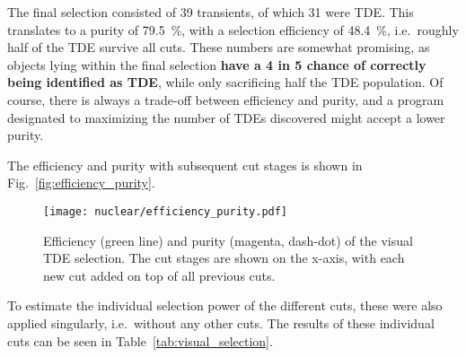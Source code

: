 The final selection consisted of 39 transients, of which 31 were TDE. This translates to a purity of \SI{79.5}{\percent}, with a selection efficiency of \SI{48.4}{\percent}, i.e.~roughly half of the TDE survive all cuts. These numbers are somewhat promising, as objects lying within the final selection \textbf{have a 4 in 5 chance of correctly being identified as TDE}, while only sacrificing half the TDE population. Of course, there is always a trade-off between efficiency and purity, and a program designated to maximizing the number of TDEs discovered might accept a lower purity.

The efficiency and purity with subsequent cut stages is shown in Fig.~\ref{fig:efficiency_purity}.

\begin{figure}[htpb]
    \texttt{[image: nuclear/efficiency\_purity.pdf]}
    \caption[Visual TDE selection]{Efficiency (green line) and purity (magenta, dash-dot) of the visual TDE selection. The cut stages are shown on the x-axis, with each new cut added on top of all previous cuts.}
\end{figure}
To estimate the individual selection power of the different cuts, these were also applied singularly, i.e.~without any other cuts. The results of these individual cuts can be seen in Table~\ref{tab:visual_selection}.

